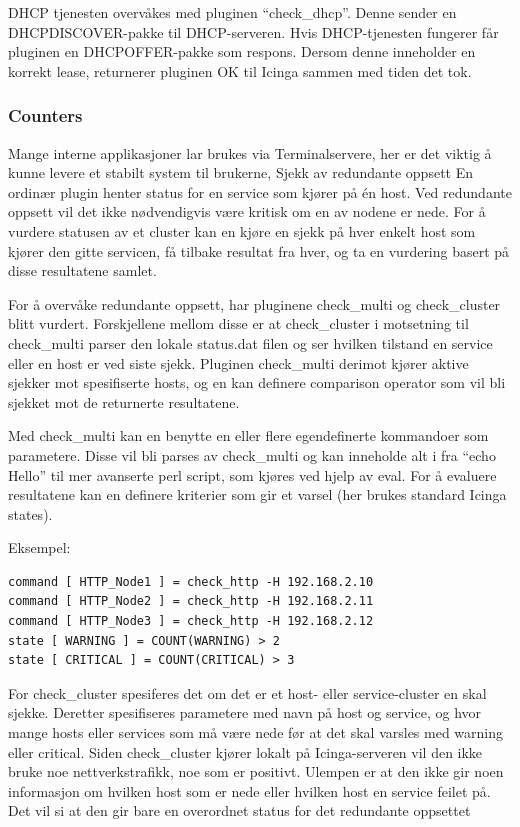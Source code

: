 DHCP tjenesten overvåkes med pluginen “check\_dhcp”. Denne sender en DHCPDISCOVER-pakke til DHCP-serveren. Hvis DHCP-tjenesten fungerer får pluginen en DHCPOFFER-pakke som respons. Dersom denne inneholder en korrekt lease, returnerer pluginen OK til Icinga sammen med tiden det tok.

\subsubsection{Counters}
Mange interne applikasjoner lar brukes via Terminalservere, her er det viktig å kunne levere et stabilt system til brukerne, 
Sjekk av redundante oppsett
En ordinær plugin henter status for en service som kjører på én host. Ved redundante oppsett vil det ikke nødvendigvis være kritisk om en av nodene er nede. For å vurdere statusen av et cluster kan en kjøre en sjekk på hver enkelt host som kjører den gitte servicen, få tilbake resultat fra hver, og ta en vurdering basert på disse resultatene samlet.

For å overvåke redundante oppsett, har pluginene check\_multi og check\_cluster blitt vurdert.  Forskjellene mellom disse er at check\_cluster i motsetning til check\_multi parser den lokale status.dat filen og ser hvilken tilstand en service eller en host er ved siste sjekk. Pluginen check\_multi derimot kjører aktive sjekker mot spesifiserte hosts, og en kan definere comparison operator som vil bli sjekket mot de returnerte resultatene.

Med check\_multi kan en benytte en eller flere egendefinerte kommandoer som parametere. Disse vil bli parses av check\_multi og kan inneholde alt i fra “echo Hello” til mer avanserte perl script, som kjøres ved hjelp av eval. For å evaluere resultatene kan en definere kriterier som gir et varsel (her brukes standard Icinga states). 

Eksempel:
\begin{lstlisting}
command [ HTTP_Node1 ] = check_http -H 192.168.2.10
command [ HTTP_Node2 ] = check_http -H 192.168.2.11
command [ HTTP_Node3 ] = check_http -H 192.168.2.12
state [ WARNING ] = COUNT(WARNING) > 2
state [ CRITICAL ] = COUNT(CRITICAL) > 3
\end{lstlisting}
For check\_cluster spesiferes det om det er et host- eller service-cluster en skal sjekke. Deretter spesifiseres parametere med navn på host og service, og hvor mange hosts eller services som må være nede før at det skal varsles med warning eller critical. Siden check\_cluster kjører lokalt på Icinga-serveren vil den ikke bruke noe nettverkstrafikk, noe som er positivt. Ulempen er at den ikke gir noen informasjon om hvilken host som er nede eller hvilken host en service feilet på. Det vil si at den gir bare en overordnet status for det redundante oppsettet     

